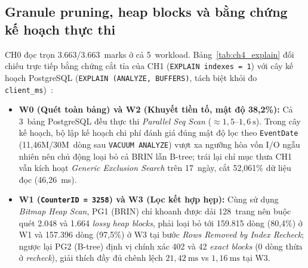\documentclass[13pt,a4paper]{report}
\begin{document}
\subsection{Granule pruning, heap blocks và bằng chứng kế hoạch thực thi}
CH0 đọc trọn 3.663/3.663~marks ở cả 5~workload. Bảng~\ref{tab:ch4_explain} đối chiếu trực tiếp bằng chứng cắt tỉa của CH1 (\texttt{EXPLAIN indexes = 1}) với cây kế hoạch PostgreSQL (\texttt{EXPLAIN (\allowbreak{}ANALYZE, BUFFERS)}, tách biệt khỏi đo \texttt{client\_\allowbreak{}ms})~\cite{S7, P9}:
\begin{itemize}
    \setlength{\itemsep}{3pt}\setlength{\parskip}{0pt}
    \item \textbf{W0 (Quét toàn bảng) và W2 (Khuyết tiền tố, mật độ 38,2\%):} Cả 3~bảng PostgreSQL đều thực thi \textit{Parallel Seq Scan} ($\approx 1{,}5\text{--}1{,}6~\text{s}$). Trong cây kế hoạch, bộ lập kế hoạch chi phí đánh giá đúng mật độ lọc theo \texttt{EventDate} (11,46M/30M~dòng sau \texttt{VACUUM ANALYZE}) vượt xa ngưỡng hòa vốn I/O ngẫu nhiên nên chủ động loại bỏ cả BRIN lẫn B-tree; trái lại chỉ mục thưa CH1 vẫn kích hoạt \textit{Generic Exclusion Search} trên 17~ngày, cắt 52,061\% dữ liệu đọc (46,26~ms).
    \item \textbf{W1 (\texttt{CounterID = 3258}) và W3 (Lọc kết hợp hẹp):} Cùng sử dụng \textit{Bitmap Heap Scan}, PG1 (BRIN) chỉ khoanh được dải 128~trang nên buộc quét 2.048 và 1.664 \textit{lossy heap blocks}, phải loại bỏ tới 159.815 dòng (80,4\%) ở W1 và 157.396 dòng (97,5\%) ở W3 tại bước \textit{Rows Removed by Index Recheck}; ngược lại PG2 (B-tree) định vị chính xác 402 và 42 \textit{exact blocks} (0 dòng thừa ở \textit{recheck}), giải thích đầy đủ chênh lệch $21{,}42~\text{ms}$ vs $1{,}16~\text{ms}$ tại W3.
\end{itemize}
\end{document}
